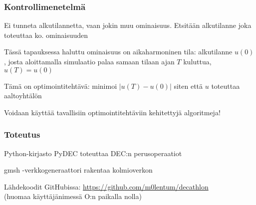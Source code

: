 \documentclass{beamer}
\begin{document}
\begin{frame}
  \frametitle{Kontrollimenetelmä}

  Ei tunneta alkutilannetta, vaan jokin muu ominaisuus.
  Etsitään alkutilanne joka toteuttaa ko. ominaisuuden
  
  \pause

  Tässä tapauksessa haluttu ominaisuus on aikaharmoninen tila:
  alkutilanne $u(0)$, josta aloittamalla
  simulaatio palaa samaan tilaan ajan $T$ kuluttua, $u(T) = u(0)$

  \pause

  Tämä on optimointitehtävä: minimoi $|u(T) - u(0)|$
  siten että $u$ toteuttaa aaltoyhtälön

  Voidaan käyttää tavallisiin optimointitehtäviin kehitettyjä algoritmeja!
\end{frame}

\begin{frame}
  \frametitle{Toteutus}

  Python-kirjasto PyDEC toteuttaa DEC:n perusoperaatiot

  gmsh -verkkogeneraattori rakentaa kolmioverkon

  Lähdekoodit GitHubissa: \url{https://github.com/m0lentum/decathlon} \\
  (huomaa käyttäjänimessä O:n paikalla nolla)
\end{frame}
\end{document}
